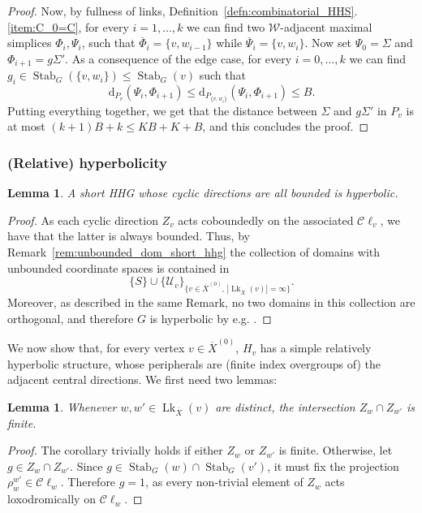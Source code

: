 \documentclass[svgnames]{amsart}
\theoremstyle{plain}
\newtheorem{lemma}[thm]{Lemma}
\theoremstyle{definition}
\newcommand{\C}{\mathcal C}
\newcommand{\ov}[1]{\overline{#1}}
\newcommand{\U}{\mathcal{U}}
\newcommand{\dist}{\mathrm{d}}
\newcommand{\link}{\operatorname{Lk}}
\newcommand{\Stab}[2]{\operatorname{Stab}_{#1}(#2)}
\newcommand{\W}{\mathcal{W}}
\begin{document}
\begin{proof}
Now, by fullness of links, Definition~\ref{defn:combinatorial_HHS}.\eqref{item:C_0=C}, for every $i=1,\ldots, k$ we can find two $\W$-adjacent maximal simplices $\Phi_i, \Psi_i$, such that $\ov\Phi_i=\{v, w_{i-1}\}$ while $\ov\Psi_i=\{v, w_{i}\}$. Now set $\Psi_0=\Sigma$ and $\Phi_{i+1}=g \Sigma'$. As a consequence of the edge case, for every $i=0,\ldots, k$ we can find $g_i\in \Stab{G}{\{v, w_i\}}\le \Stab{G}{v}$ such that $$\dist_{P_v}(\Psi_i, \Phi_{i+1})\le \dist_{P_{\{v,w_i\}}}(\Psi_i, \Phi_{i+1})\le B.$$
Putting everything together, we get that the distance between $\Sigma$ and $g\Sigma'$ in $P_v$ is at most $(k+1)B+k\le KB+K+B$, and this concludes the proof.
\end{proof}







\subsubsection{(Relative) hyperbolicity}
\begin{lemma}\label{lem:hyperbolic_short_HHG}
    A short HHG whose cyclic directions are all bounded is hyperbolic.
\end{lemma}

\begin{proof}
As each cyclic direction $Z_v$ acts coboundedly on the associated $\C\ell_v$, we have that the latter is always bounded. Thus, by
Remark~\ref{rem:unbounded_dom_short_hhg} the collection of domains with unbounded coordinate spaces is contained in $$\{S\}\cup\{\U_v\}_{\{v\in \ov X^{(0)},\,|\link_{\ov X}(v)|=\infty\}}.$$ 
Moreover, as described in the same Remark, no two domains in this collection are orthogonal, and therefore $G$ is hyperbolic by e.g. \cite[Corollary 2.16]{quasiflats}.
\end{proof}

We now show that, for every vertex $v\in \ov X^{(0)}$, $H_v$ has a simple relatively hyperbolic structure, whose peripherals are (finite index overgroups of) the adjacent central directions. We first need two lemmas:


\begin{lemma}\label{lem:finite_int_w-v-w'}
    Whenever $w,w'\in\link_{\ov X}(v)$ are distinct, the intersection $Z_w\cap Z_{w'}$ is finite. 
\end{lemma}


\begin{proof}
    The corollary trivially holds if either $Z_w$ or $ Z_{w'}$ is finite. Otherwise, let $g\in Z_w\cap Z_{w'}$. Since $g\in \Stab{G}{w}\cap \Stab{G}{v'}$, it must fix the projection $\rho^{w'}_w\in\C\ell_w$. Therefore $g=1$, as every non-trivial element of $Z_w$ acts loxodromically on $\C \ell_w$.
\end{proof}
\end{document}
